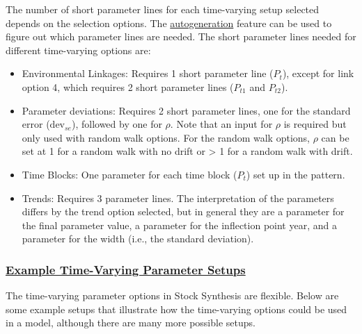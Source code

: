 The number of short parameter lines for each time-varying setup selected depends on the selection options. The \hyperlink{autogen}{autogeneration} feature can be used to figure out which parameter lines are needed. The short parameter lines needed for different time-varying options are:
\begin{itemize}
	\item Environmental Linkages: Requires 1 short parameter line ($P_{t}$), except for link option 4, which requires 2 short parameter lines ($P_{t1}$ and $P_{t2}$).
	\item Parameter deviations: Requires 2 short parameter lines, one for the standard error ($\text{dev}_{se}$), followed by one for $\rho$. Note that an input for $\rho$ is required but only used with random walk options. For the random walk options, $\rho$ can be set at 1 for a random walk with no drift or > 1 for a random walk with drift.
	\item Time Blocks: One parameter for each time block ($P_{t}$) set up in the pattern.
	\item Trends: Requires 3 parameter lines. The interpretation of the parameters differs by the trend option selected, but in general they are a parameter for the final parameter value, a parameter for the inflection point year, and a parameter for the width (i.e., the standard deviation).
\end{itemize}

\hypertarget{ExTVParam}{}
\subsubsection[Example Time-Varying Parameter Setups]{\protect\hyperlink{ExTVParam}{Example Time-Varying Parameter Setups}}

The time-varying parameter options in Stock Synthesis are flexible. Below are some example setups that illustrate how the time-varying options could be used in a model, although there are many more possible setups.


